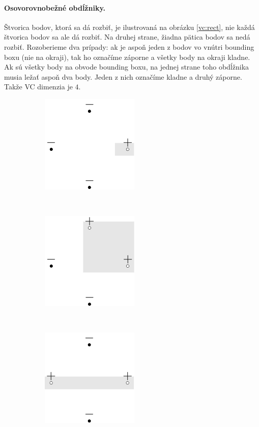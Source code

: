 \paragraph{Osovorovnobežné obdĺžniky.} Štvorica bodov, ktorá sa dá
rozbiť, je ilustrovaná na obrázku \ref{vc:rect}, nie každá štvorica
bodov sa ale dá rozbiť. Na druhej strane, žiadna pätica bodov sa nedá
rozbiť. Rozoberieme dva prípady: ak je aspoň jeden z bodov vo vnútri 
bounding boxu (nie na okraji), tak ho označíme záporne a všetky body na 
okraji kladne. Ak sú všetky body na obvode bounding boxu, na jednej 
strane toho obdĺžnika musia ležať aspoň dva body. Jeden z nich označíme 
kladne a druhý záporne. Takže VC dimenzia je $4$.

\begin{figure}
  \centering
  \begin{subfigure}[b]{0.23\linewidth}
    \centering
    \includegraphics[scale=1]{obrazky/vc_rect1.pdf}
    \caption{}
  \end{subfigure}
  ~
  \centering
  \begin{subfigure}[b]{0.23\linewidth}
    \centering
    \includegraphics[scale=1]{obrazky/vc_rect2.pdf}
    \caption{}
  \end{subfigure}
  ~
  \centering
  \begin{subfigure}[b]{0.23\linewidth}
    \centering
    \includegraphics[scale=1]{obrazky/vc_rect3.pdf}

\end{subfigure}
\end{figure}
